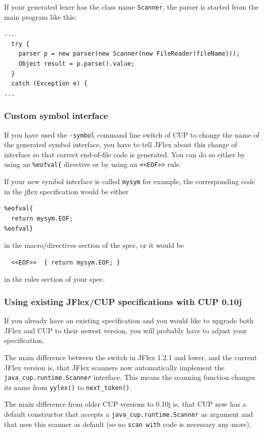 \documentclass[11pt]{scrartcl}
\newcommand{\xsmall}{}
\begin{document}
If your generated lexer has the class name \texttt{Scanner}, the parser
is started from the main program like this:

{\xsmall\begin{verbatim}
...
  try {
    parser p = new parser(new Scanner(new FileReader(fileName)));
    Object result = p.parse().value;
  }
  catch (Exception e) {
...
\end{verbatim}
}

\subsubsection{Custom symbol interface}
If you have used the \texttt{-symbol} command line switch of CUP to change
the name of the generated symbol interface, you have to tell JFlex about
this change of interface so that correct end-of-file code is generated. 
You can do so either by using an \verb+%eofval{+ directive or by using
an \texttt{<<EOF>>} rule. 

If your new symbol interface is called \texttt{mysym} for example, the
corresponding code in the jflex specification would be either

{\xsmall
\begin{verbatim}
%eofval{
  return mysym.EOF;
%eofval}
\end{verbatim}
}

in the macro/directives section of the spec, or it would be

{\xsmall
\begin{verbatim}
  <<EOF>>  { return mysym.EOF; }
\end{verbatim}
}

in the rules section of your spec.

\subsubsection{Using existing JFlex/CUP specifications with CUP 0.10j}
If you already have an existing specification and you would like to upgrade
both JFlex and CUP to their newest version, you will probably have to adjust
your specification.

The main difference between the \texttt{} switch in
JFlex 1.2.1 and lower, and the current JFlex version is, that JFlex scanners
now automatically implement the \texttt{java\_cup.runtime.Scanner} interface.
This means the scanning function changes its name from \texttt{yylex()}
to \texttt{next\_token()}. 

The main difference from older CUP versions to 0.10j is, that CUP now
has a default constructor that accepts a \texttt{java\_cup.runtime.Scanner} 
as argument and that uses this scanner as
default (so no \texttt{scan with} code is necessary any more).
\end{document}
